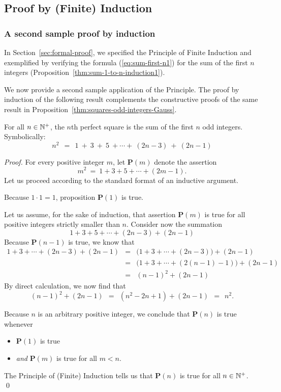 \subsection{Proof by (Finite) Induction}
\label{sec:Induction}

\subsubsection{A second sample proof by induction}

In Section~\ref{sec:formal-proof}, we specified the Principle of
Finite Induction  and
exemplified by verifying the formula (\ref{eq:sum-first-n1}) for the
sum of the first $n$ integers
(Proposition~\ref{thm:sum-1-to-n-induction1}).

We now provide a second sample application of the Principle.  The
proof by induction of the following result complements the
constructive proofs of the same result in
Proposition~\ref{thm:squares-odd-integers-Gauss}.

\begin{prop}
\label{thm:squares-odd-integers-induction1}
For all $n \in \mathbb{N}^+$, the $n$th perfect square is the sum of the first
$n$ odd integers.  Symbolically:
\[
n^2 \ \ = \ \
1 \ + \ 3 \ + \ 5 \ + \cdots + \ (2n-3) \ + \ (2n-1)
\]
\end{prop}

\begin{proof}
For every positive integer $m$, let {\bf P}$(m)$ denote the assertion
\[ m^2 \ = \ 1 + 3 + 5 + \cdots + (2m-1). \]
Let us proceed according to the standard format of an inductive
argument.

Because $1 \cdot 1 = 1$, proposition {\bf P}$(1)$ is true.

Let us assume, for the sake of induction, that assertion {\bf
  P}$(m)$ is true for all positive integers strictly smaller than $n$.
Consider now the summation
\[ 1 + 3 + 5 + \cdots + (2n-3) + (2n-1) \]
Because {\bf P}$(n-1)$ is true, we know that
\begin{eqnarray*}
1 + 3 + \cdots + (2n-3) + (2n-1)
  & = & 
\big(1 + 3 + \cdots + (2n-3) \big) + (2n-1) \\
  & = &
\big(1 + 3 + \cdots + (2(n-1) -1) \big) + (2n-1) \\
  & = & (n-1)^2 + (2n-1)
\end{eqnarray*}
By direct calculation, we now find that
\[ (n-1)^2 + (2n-1) \ \ = \ \ (n^2 -2n +1) + (2n-1) \ \ = \ \ n^2. \]

\noindent
Because $n$ is an arbitrary positive integer, we conclude that
{\bf P}$(n)$ is true whenever
\begin{itemize}
\item
{\bf P}$(1)$ is true
\item
{\em and}
{\bf P}$(m)$ is true for all $m < n$.
\end{itemize}
The Principle of (Finite) Induction tells us that {\bf P}$(n)$
is true for all $n \in \mathbb{N}^+$.  \qed
\end{proof}


